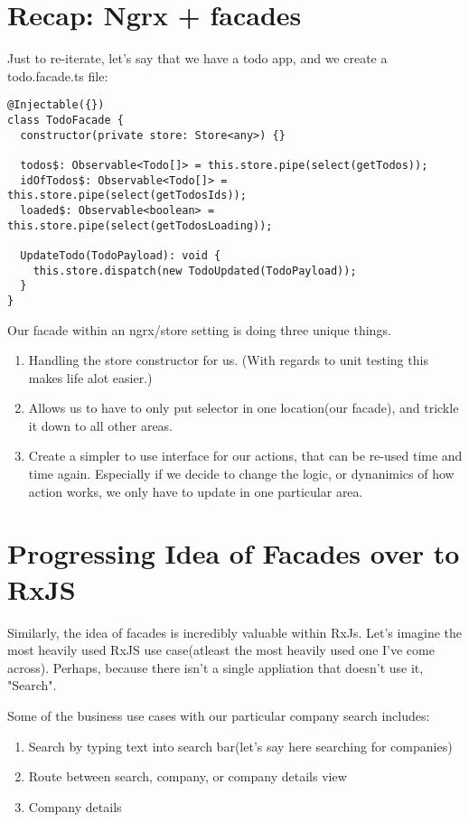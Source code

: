 \section{Recap: Ngrx + facades}
Just to re-iterate, let's say that we have a todo app, and we create a todo.facade.ts file:

\begin{lstlisting}[caption=todo.facade.ts]
@Injectable({})
class TodoFacade {
  constructor(private store: Store<any>) {}

  todos$: Observable<Todo[]> = this.store.pipe(select(getTodos));
  idOfTodos$: Observable<Todo[]> = this.store.pipe(select(getTodosIds));
  loaded$: Observable<boolean> = this.store.pipe(select(getTodosLoading));

  UpdateTodo(TodoPayload): void {
    this.store.dispatch(new TodoUpdated(TodoPayload));
  }
}  
\end{lstlisting}

Our facade within an ngrx/store setting is doing three unique things.
\begin{enumerate}
  \item Handling the store constructor for us. (With regards to unit testing this makes life alot easier.)
  \item Allows us to have to only put selector in one location(our facade), and trickle it down to all other areas. 
  \item Create a simpler to use interface for our actions, that can be re-used time and time again. Especially if we decide to change the logic, or dynanimics of how action works, we only have to update in one particular area. 
\end{enumerate}

\section{Progressing Idea of Facades over to RxJS}
Similarly, the idea of facades is incredibly valuable within RxJs. Let's imagine the most heavily used RxJS use case(atleast the most heavily used one I've come across). Perhaps, because there isn't a single appliation that doesn't use it, "Search".

Some of the business use cases with our particular company search includes: 
\begin{enumerate}
  \item Search by typing text into search bar(let's say here searching for companies)
  \item Route between search, company, or company details view 
  \item Company details
\end{enumerate}


